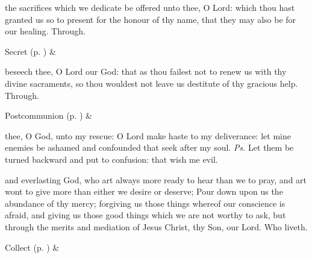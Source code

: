 \secret
{} the sacrifices which we dedicate be offered unto thee, O Lord: which thou hast granted us so to present for the honour of thy name, that they may also be for our healing. Through.
\begin{rubric}
     Secret  (p. \pageref{SPSaints}) \&  
\end{rubric}


\postcommunion
{} beseech thee, O Lord our God: that as thou failest not to renew us with thy divine sacraments, so thou wouldest not leave us destitute of thy gracious help. Through.
\begin{rubric}
     Postcommunion  (p. \pageref{SPSaints}) \&  
\end{rubric}


\clearpage
{}


\introit
{} thee, O God, unto my rescue: O Lord make haste to my deliverance: let mine enemies be ashamed and confounded that seek after my soul. \textit{Ps.} Let them be turned backward and put to confusion: that wish me evil.

\collect
{} and everlasting God, who art always more ready to hear than we to pray, and art wont to give more than either we desire or deserve; Pour down upon us the abundance of thy mercy; forgiving us those things whereof our conscience is afraid, and giving us those good things which we are not worthy to ask, but through the merits and mediation of Jesus Christ, thy Son, our Lord. Who liveth.
\begin{rubric}
     Collect  (p. \pageref{SPSaints}) \&  
\end{rubric}

